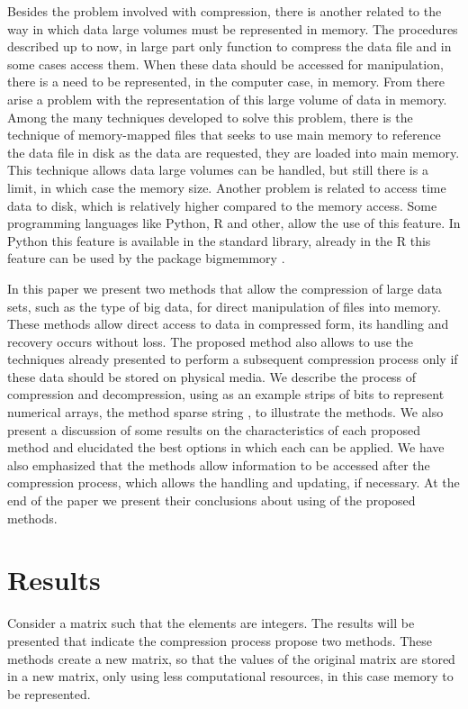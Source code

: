 \documentclass[10pt]{article}
\begin{document}
Besides the problem involved with compression, there is another related to the way in which data large volumes must be represented in memory. The procedures described up to now, in large part only function to compress the data file and in some cases access them. When these data should be accessed for manipulation, there is a need to be represented, in the computer case, in memory. From there arise a problem with the representation of this large volume of data in memory. Among the many techniques developed to solve this problem, there is the technique of memory-mapped files that seeks to use main memory to reference the data file in disk as the data are requested, they are loaded into main memory. This technique allows data large volumes can be handled, but still there is a limit, in which case the memory size. Another problem is related to access time data to disk, which is relatively higher compared to the memory access. Some programming languages ​​like Python, R and other, allow the use of this feature. 
In Python this feature is available in the standard library, already in the R this feature can be used by the package bigmemmory \cite{big}.

In this paper we present two methods that allow the compression of large data sets, such as the type of big data, for direct manipulation of files into memory. These methods allow direct access to data in compressed form, its handling and recovery occurs without loss. The proposed method also allows to use the techniques already presented to perform a subsequent compression process only if these data should be stored on physical media. We describe the process of compression and decompression, using as an example strips of bits to represent numerical arrays, the method sparse string \cite{salomon,salomon2}, to illustrate the methods. We also present a discussion of some results on the characteristics of each proposed method and elucidated the best options in which each can be applied. We have also emphasized that the methods allow information to be accessed after the compression process, which allows the handling and updating, if necessary. At the end of the paper we present their conclusions about using of 
the proposed methods.

\section*{Results}

Consider a matrix such that the elements are integers. The results will be presented that indicate the compression process propose two methods. These methods create a new matrix, so that the values ​​of the original matrix are stored in a new matrix, only using less computational resources, in this case memory to be represented.
\end{document}
